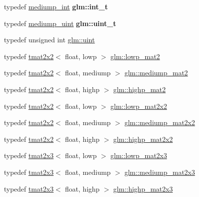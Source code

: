 \begin{DoxyCompactItemize}
\item 
\mbox{\label{group__core__precision_gacd01d170508f812968875b0f2e730e8c}} 
typedef \hyperlink{group__core__precision_ga2a3dcbcd7f4e17663d393a12061ac6ac}{mediump\+\_\+int} {\bfseries glm\+::int\+\_\+t}
\item 
\mbox{\label{group__core__precision_ga5f2ae871c284c9d39ae8fdbb1305b566}} 
typedef \hyperlink{group__core__precision_ga08ae38ad78ade3539fdd1d25052b8c51}{mediump\+\_\+uint} {\bfseries glm\+::uint\+\_\+t}
\item 
typedef unsigned int \hyperlink{group__core__precision_ga4fd29415871152bfb5abd588334147c8}{glm\+::uint}
\item 
typedef \hyperlink{structglm_1_1tmat2x2}{tmat2x2}$<$ float, lowp $>$ \hyperlink{group__core__precision_ga2eb6d28afe554e1a2ebc79e3201e8651}{glm\+::lowp\+\_\+mat2}
\item 
typedef \hyperlink{structglm_1_1tmat2x2}{tmat2x2}$<$ float, mediump $>$ \hyperlink{group__core__precision_ga3b83486a767447bf1b36bbf32e589bac}{glm\+::mediump\+\_\+mat2}
\item 
typedef \hyperlink{structglm_1_1tmat2x2}{tmat2x2}$<$ float, highp $>$ \hyperlink{group__core__precision_ga8539ada9351e0a74964fa23c040246cf}{glm\+::highp\+\_\+mat2}
\item 
typedef \hyperlink{structglm_1_1tmat2x2}{tmat2x2}$<$ float, lowp $>$ \hyperlink{group__core__precision_ga764ca10ac431c7306adaf9e134795919}{glm\+::lowp\+\_\+mat2x2}
\item 
typedef \hyperlink{structglm_1_1tmat2x2}{tmat2x2}$<$ float, mediump $>$ \hyperlink{group__core__precision_ga7f27d5d720010e94d8a98eaaaf7f1f32}{glm\+::mediump\+\_\+mat2x2}
\item 
typedef \hyperlink{structglm_1_1tmat2x2}{tmat2x2}$<$ float, highp $>$ \hyperlink{group__core__precision_ga20b66861ebdfa14586f4028c5ef16d2e}{glm\+::highp\+\_\+mat2x2}
\item 
typedef \hyperlink{structglm_1_1tmat2x3}{tmat2x3}$<$ float, lowp $>$ \hyperlink{group__core__precision_ga9fb4a4c96e13e4954bff1af2f99408cb}{glm\+::lowp\+\_\+mat2x3}
\item 
typedef \hyperlink{structglm_1_1tmat2x3}{tmat2x3}$<$ float, mediump $>$ \hyperlink{group__core__precision_ga39eba94b5dc46f46481c9c4428609731}{glm\+::mediump\+\_\+mat2x3}
\item 
typedef \hyperlink{structglm_1_1tmat2x3}{tmat2x3}$<$ float, highp $>$ \hyperlink{group__core__precision_ga96ec9c154598fcc1c113d9ebd3680097}{glm\+::highp\+\_\+mat2x3}

\end{DoxyCompactItemize}
